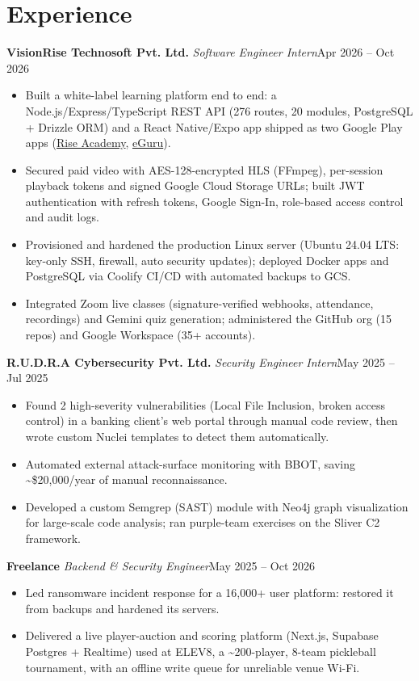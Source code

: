 \documentclass[10pt, a4paper]{article}
\newcommand{\role}[3]{\par\vspace{2.5pt}\textbf{#1} \textbar{} \textit{#2}\hfill #3\par}
\newcommand{\lnk}[2]{\href{#1}{\color{linkc}#2}}
\begin{document}
\section{Experience}
\role{VisionRise Technosoft Pvt. Ltd.}{Software Engineer Intern}{Apr 2026 -- Oct 2026}
\begin{itemize}
  \item Built a white-label learning platform end to end: a Node.js/Express/TypeScript REST API (276 routes, 20 modules,
  PostgreSQL + Drizzle ORM) and a React Native/Expo app shipped as two Google Play apps (\lnk{https://play.google.com/store/apps/details?id=tech.riseinstitute.app}{Rise Academy},
  \lnk{https://play.google.com/store/apps/details?id=app.eguru.lms}{eGuru}).
  \item Secured paid video with AES-128-encrypted HLS (FFmpeg), per-session playback tokens and signed Google Cloud
  Storage URLs; built JWT authentication with refresh tokens, Google Sign-In, role-based access control and audit logs.
  \item Provisioned and hardened the production Linux server (Ubuntu 24.04 LTS: key-only SSH, firewall, auto security
  updates); deployed Docker apps and PostgreSQL via Coolify CI/CD with automated backups to GCS.
  \item Integrated Zoom live classes (signature-verified webhooks, attendance, recordings) and Gemini quiz generation; administered the GitHub org (15 repos) and Google Workspace (35+ accounts).
\end{itemize}

\role{R.U.D.R.A Cybersecurity Pvt. Ltd.}{Security Engineer Intern}{May 2025 -- Jul 2025}
\begin{itemize}
  \item Found 2 high-severity vulnerabilities (Local File Inclusion, broken access control) in a banking client's web
  portal through manual code review, then wrote custom Nuclei templates to detect them automatically.
  \item Automated external attack-surface monitoring with BBOT, saving \textasciitilde{}\$20,000/year of manual reconnaissance.
  \item Developed a custom Semgrep (SAST) module with Neo4j graph visualization for large-scale code analysis; ran
  purple-team exercises on the Sliver C2 framework.
\end{itemize}

\role{Freelance}{Backend \& Security Engineer}{May 2025 -- Oct 2026}
\begin{itemize}
  \item Led ransomware incident response for a 16,000+ user platform: restored it from backups and hardened its servers.
  \item Delivered a live player-auction and scoring platform (Next.js, Supabase Postgres + Realtime) used at ELEV8, a
  \textasciitilde{}200-player, 8-team pickleball tournament, with an offline write queue for unreliable venue Wi-Fi.
\end{itemize}
\end{document}
